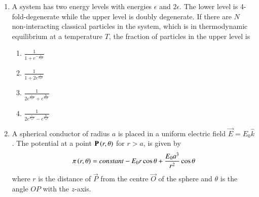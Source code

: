 \documentclass[journal]{IEEEtran}
\begin{document}
\begin{enumerate}
\begin{multicols}{4}
    \begin{enumerate}
        \item $2k_B \ln N$
        \item $3k_B \ln N$
        \item $Nk_B \ln 2$
        \item $Nk_B \ln 3$
    \end{enumerate}
\end{multicols}
\item A system has two energy levels with energies $\epsilon$ and $2\epsilon$. The lower level is 4-fold-degenerate while the upper level is doubly degenerate. If there are $N$ non-interacting classical particles in the system, which is in thermodynamic equilibrium at a temperature $T$, the fraction of particles in the upper level is
\begin{multicols}{2}
    \begin{enumerate}
        \item $\frac{1}{1+e^{-\frac{\epsilon}{k_BT}}}$
        \item $\frac{1}{1+2e^{\frac{\epsilon}{k_BT}}}$
        \item $\frac{1}{2e^{\frac{\epsilon}{k_BT}}+e^{\frac{2\epsilon}{k_BT}}}$
        \item $\frac{1}{2e^{\frac{\epsilon}{k_BT}}-e^{\frac{2\epsilon}{k_BT}}}$
    \end{enumerate}
\end{multicols}
\item A spherical conductor of radius $a$ is placed in a uniform electric field $\vec{E}=E_0\hat{k}$. The potential at a point $\mathbf{P}\left(r,\theta\right)$ for $ r>a $, is given by
\begin{align*}
    \pi \left(r,\theta\right)=constant-E_0r\cos\theta +\frac{E_0a^3}{r^2}\cos\theta
\end{align*}
where $r$ is the distance of $\vec{P}$ from the centre $\vec{O}$ of the sphere and $\theta$ is the angle $OP$ with the $z$-axis.
\end{enumerate}
\end{document}
